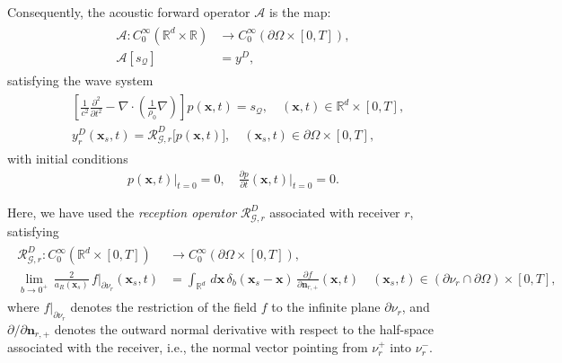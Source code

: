 \documentclass[11pt,reqno]{amsart}
\theoremstyle{remark}
\newcommand{\bx}{\boldsymbol{x}}
\newcommand{\bn}{\boldsymbol{n}}
\begin{document}
Consequently, the acoustic forward operator $\mathcal{A}$ is the map:
\begin{align}  \label{eq:operator-forward}
\begin{split}
\mathcal{A}: C_0^{\infty}(\mathbb{R}^d \times \mathbb{R}) &\rightarrow  C_0^{\infty}\left(\partial \Omega \times [0,T]\right) , \\
\mathcal{A}[s_{\mathcal{Q}}] &= y^D,
\end{split}
\end{align}
satisfying the wave system \cite{Javaherian2022}
\begin{align} \label{eq:wave-pat}
\begin{split}
 &\left[ \frac{1}{c^2}\frac{\partial^2}{\partial t^2} - \nabla \cdot \left( \frac{1}{\rho_0} \nabla \right)  \right] p(\bx, t) =  s_{\mathcal{Q}},  \quad (\bx,t) \in \mathbb{R}^d \times [0,T], \\
&y_r^D(\bx_s, t) = \mathcal{R}_{\mathcal{G},r}^D \big[p (\bx,t) \big], \quad  (\bx_s,t) \in \partial \Omega \times [0,T],
\end{split}
\end{align}
with initial conditions
\begin{align}  \label{eq:cauchy1}
    p(\bx, t) \big|_{t=0} = 0, \quad 
    \frac{\partial p}{\partial t} (\bx, t) \big|_{t=0} = 0.
\end{align}

Here, we have used the \emph{reception operator} \(\mathcal{R}_{\mathcal{G},r}^D\) associated with receiver \(r\), satisfying \cite{Javaherian2022}
\begin{align} \label{eq:reception}
\begin{split}
\mathcal{R}_{\mathcal{G},r}^D : C_0^{\infty}\!\left( \mathbb{R}^d \times [0,T] \right)
&\longrightarrow 
C_0^{\infty}\!\left( \partial \Omega \times [0,T] \right), \\
\lim_{b \to 0^+} \, \frac{2}{a_R(\bx_s)}\, f\big|_{\partial \nu_r} (\bx_s,t)
&=
\int_{\mathbb{R}^d}  \, d\bx  \, \delta_b(\bx_s - \bx)
\, \frac{\partial f}{\partial \bn_{r,+}}(\bx,t) 
\quad (\bx_s,t)  \in (\partial \nu_r \cap \partial \Omega) \times [0,T],
\end{split}
\end{align}
where \( f\big|_{\partial \nu_r}\) denotes the restriction of the field \(f\) to the infinite plane \(\partial \nu_r\), and \( \partial / \partial \bn_{r,+} \) denotes the outward normal derivative with respect to the half-space associated with the receiver, i.e., the normal vector pointing from \( \nu_r^{+} \) into \( \nu_r^{-} \).
\end{document}

